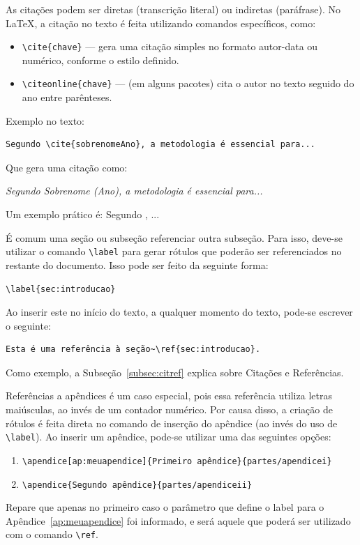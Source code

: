As citações podem ser diretas (transcrição literal) ou indiretas (paráfrase). No \LaTeX, a citação no texto é feita utilizando comandos específicos, como:

\begin{itemize}
    \item \texttt{\textbackslash cite\{chave\}} — gera uma citação simples no formato autor-data ou numérico, conforme o estilo definido.
    \item \texttt{\textbackslash citeonline\{chave\}} — (em alguns pacotes) cita o autor no texto seguido do ano entre parênteses.
\end{itemize}

Exemplo no texto:

\begin{verbatim}
Segundo \cite{sobrenomeAno}, a metodologia é essencial para...
\end{verbatim}

Que gera uma citação como:

\textit{Segundo Sobrenome (Ano), a metodologia é essencial para...}

Um exemplo prático é: Segundo \cite{Knuth_1986_texbook}, ...

\label{subsubsec:referencias}

É comum uma seção ou subseção referenciar outra subseção. Para isso, deve-se utilizar o comando \verb+\label+ para gerar rótulos que poderão ser referenciados no restante do documento. Isso pode ser feito da seguinte forma:

\begin{verbatim}
\label{sec:introducao}
\end{verbatim}

Ao inserir este no início do texto, a qualquer momento do texto, pode-se escrever o seguinte:
\begin{verbatim}
Esta é uma referência à seção~\ref{sec:introducao}.
\end{verbatim}

Como exemplo, a Subseção~\ref{subsec:citref} explica sobre Citações e Referências.

Referências a apêndices é um caso especial, pois essa referência utiliza letras maiúsculas, ao invés de um contador numérico. Por causa disso, a criação de rótulos é feita direta no comando de inserção do apêndice (ao invés do uso de \verb+\label+). Ao inserir um apêndice, pode-se utilizar uma das seguintes opções:

\begin{enumerate}
    \item \verb+\apendice[ap:meuapendice]{Primeiro apêndice}{partes/apendicei}+
    \item \verb+\apendice{Segundo apêndice}{partes/apendiceii}+
\end{enumerate}

Repare que apenas no primeiro caso o parâmetro que define o label para o Apêndice~\ref{ap:meuapendice} foi informado, e será aquele que poderá ser utilizado com o comando \verb+\ref+.
